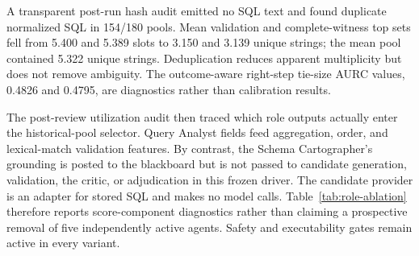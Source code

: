 \documentclass[information,article,submit,moreauthors]{Definitions/mdpi}
\begin{document}
A transparent post-run hash audit emitted no SQL text and found duplicate normalized SQL in 154/180 pools. Mean validation and complete-witness top sets fell from 5.400 and 5.389 slots to 3.150 and 3.139 unique strings; the mean pool contained 5.322 unique strings. Deduplication reduces apparent multiplicity but does not remove ambiguity. The outcome-aware right-step tie-size AURC values, 0.4826 and 0.4795, are diagnostics rather than calibration results.

\begin{table}[htbp]
\caption{Exact global candidate-order sensitivity under the unified shape-and-denotation evaluator. All 40,320 orders are outcome-aware diagnostics; original and reverse are two members of that enumeration.}
\label{tab:sensitivity}
\centering
\small
{}
\end{table}

The post-review utilization audit then traced which role outputs actually enter the historical-pool selector. Query Analyst fields feed aggregation, order, and lexical-match validation features. By contrast, the Schema Cartographer's grounding is posted to the blackboard but is not passed to candidate generation, validation, the critic, or adjudication in this frozen driver. The candidate provider is an adapter for stored SQL and makes no model calls. Table~\ref{tab:role-ablation} therefore reports score-component diagnostics rather than claiming a prospective removal of five independently active agents. Safety and executability gates remain active in every variant.
\end{document}
